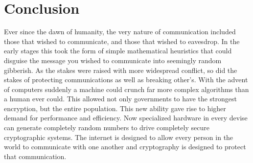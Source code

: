 \documentclass[journal]{IEEEtran}
\begin{document}




\section{Conclusion}
Ever since the dawn of humanity, the very nature of communication included those that wished to communicate, and those that wished to eavesdrop.  In the early stages this took the form of simple mathematical heuristics that could disguise the message you wished to communicate into seemingly random gibberish.  As the stakes were raised with more widespread conflict, so did the stakes of protecting communications as well as breaking other's.  With the advent of computers suddenly a machine could crunch far more complex algorithms than a human ever could.  This allowed not only governments to have the strongest encryption, but the entire population.  This new ability gave rise to higher demand for performance and efficiency.  Now specialized hardware in every devise can generate completely random numbers to drive completely secure cryptographic systems.  The internet is designed to allow every person in the world to communicate with one another and cryptography is designed to protect that communication.






%
\end{document}
